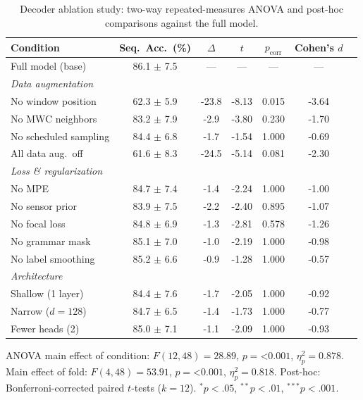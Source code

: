 \begin{table}[t]
\centering
\caption{Decoder ablation study: two-way repeated-measures ANOVA and post-hoc comparisons against the full model.}
\label{tab:ablation_anova}
\small
\begin{tabular}{@{}lcccccc@{}}
\toprule
Condition & Seq.\ Acc.\ (\%) & $\Delta$ & $t$ & $p_{\text{corr}}$ & Cohen's $d$ \\
\midrule
Full model (base) & 86.1 $\pm$ 7.5 & --- & --- & --- & --- \\
\midrule
\multicolumn{6}{l}{\textit{Data augmentation}} \\
\quad No window position & 62.3 $\pm$ 5.9 & -23.8 & -8.13 & 0.015 & -3.64 \\
\quad No MWC neighbors & 83.2 $\pm$ 7.9 & -2.9 & -3.80 & 0.230 & -1.70 \\
\quad No scheduled sampling & 84.4 $\pm$ 6.8 & -1.7 & -1.54 & 1.000 & -0.69 \\
\quad All data aug.\ off & 61.6 $\pm$ 8.3 & -24.5 & -5.14 & 0.081 & -2.30 \\
\midrule
\multicolumn{6}{l}{\textit{Loss \& regularization}} \\
\quad No MPE & 84.7 $\pm$ 7.4 & -1.4 & -2.24 & 1.000 & -1.00 \\
\quad No sensor prior & 83.9 $\pm$ 7.5 & -2.2 & -2.40 & 0.895 & -1.07 \\
\quad No focal loss & 84.8 $\pm$ 6.9 & -1.3 & -2.81 & 0.578 & -1.26 \\
\quad No grammar mask & 85.1 $\pm$ 7.0 & -1.0 & -2.19 & 1.000 & -0.98 \\
\quad No label smoothing & 85.2 $\pm$ 6.6 & -0.9 & -1.28 & 1.000 & -0.57 \\
\midrule
\multicolumn{6}{l}{\textit{Architecture}} \\
\quad Shallow (1 layer) & 84.4 $\pm$ 7.6 & -1.7 & -2.05 & 1.000 & -0.92 \\
\quad Narrow ($d{=}128$) & 84.7 $\pm$ 6.5 & -1.4 & -1.73 & 1.000 & -0.77 \\
\quad Fewer heads (2) & 85.0 $\pm$ 7.1 & -1.1 & -2.09 & 1.000 & -0.93 \\
\bottomrule
\end{tabular}
\vspace{2pt}
\begin{minipage}{\linewidth}
\footnotesize
ANOVA main effect of condition: $F(12,48)=28.89$, $p=$<$0.001$, $\eta^2_p=0.878$. Main effect of fold: $F(4,48)=53.91$, $p=$<$0.001$, $\eta^2_p=0.818$. Post-hoc: Bonferroni-corrected paired $t$-tests ($k=12$). ${}^{*}p<.05$, ${}^{**}p<.01$, ${}^{***}p<.001$.
\end{minipage}
\end{table}
